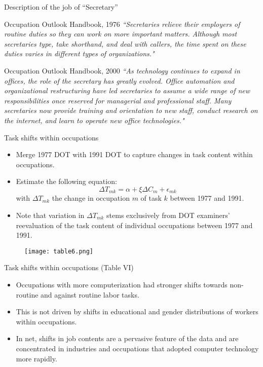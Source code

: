 \documentclass[notes=show]{beamer}
\begin{document}
\begin{frame}{Description of the job of ``Secretary''}
\begin{block}{Occupation Outlook Handbook, 1976}
\textit{``Secretaries relieve their employers of routine duties so they can work on more important matters. Although most secretaries type, take shorthand, and deal with callers, the time spent on these duties varies in different types of organizations."}
\end{block}
\begin{block}{Occupation Outlook Handbook, 2000}
\textit{``As technology continues to expand in offices, the role of the secretary has greatly evolved. Office automation and organizational restructuring have led secretaries to assume a wide range of new responsibilities once reserved for managerial and professional staff. Many secretaries now provide training and orientation to new staff, conduct research on the internet, and learn to operate new office technologies."}
\end{block}
\end{frame}

\begin{frame}{Task shifts within occupations}
\begin{itemize}
\item Merge 1977 DOT with 1991 DOT to capture changes in task content within occupations. \medskip
\item Estimate the following equation:
\[
\Delta T_{mk} = \alpha + \xi \Delta C_{m} + \epsilon_{mk} \tag{16} \label{eq16}
\]
with $\Delta T_{mk} $ the change in occupation $m$ of task $k$ between 1977 and 1991. \medskip
\item Note that variation in $\Delta T_{mk} $ stems exclusively from DOT examiners' reevaluation of the task content of individual occupations between 1977 and 1991.
\end{itemize}
\end{frame}

\newpage
\begin{center}
\begin{figure}
\texttt{[image: table6.png]}
\end{figure} 
\end{center}
\newpage

\begin{frame}{Task shifts within occupations (Table VI)}
\begin{itemize}
\item Occupations with more computerization had stronger shifts towards non-routine and against routine labor tasks.\bigskip
\item This is not driven by shifts in educational and gender distributions of workers within occupations. \bigskip
\item In net, shifts in job contents are a pervasive feature of the data and are concentrated in industries and occupations that adopted computer technology more rapidly.
\end{itemize}
\end{frame}
\end{document}

